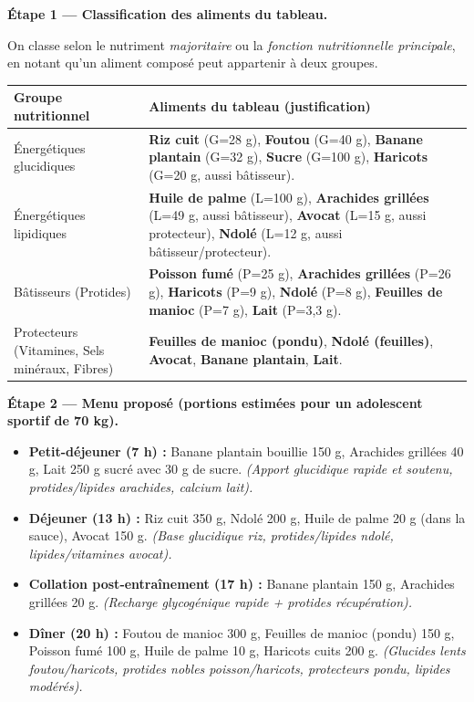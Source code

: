\documentclass[11pt]{article}
\begin{document}
\begin{exoresolu}
\textbf{Étape 1 — Classification des aliments du tableau.}

On classe selon le nutriment \emph{majoritaire} ou la \emph{fonction nutritionnelle principale}, en notant qu'un aliment composé peut appartenir à deux groupes.

\begin{center}
\begin{tabularx}{\linewidth}{|l|X|}
\hline
\rowcolor{poporangeL} \textbf{Groupe nutritionnel} & \textbf{Aliments du tableau (justification)} \\
\hline
Énergétiques glucidiques & \textbf{Riz cuit} (G=28 g), \textbf{Foutou} (G=40 g), \textbf{Banane plantain} (G=32 g), \textbf{Sucre} (G=100 g), \textbf{Haricots} (G=20 g, aussi bâtisseur). \\
\hline
Énergétiques lipidiques & \textbf{Huile de palme} (L=100 g), \textbf{Arachides grillées} (L=49 g, aussi bâtisseur), \textbf{Avocat} (L=15 g, aussi protecteur), \textbf{Ndolé} (L=12 g, aussi bâtisseur/protecteur). \\
\hline
Bâtisseurs (Protides) & \textbf{Poisson fumé} (P=25 g), \textbf{Arachides grillées} (P=26 g), \textbf{Haricots} (P=9 g), \textbf{Ndolé} (P=8 g), \textbf{Feuilles de manioc} (P=7 g), \textbf{Lait} (P=3,3 g). \\
\hline
Protecteurs (Vitamines, Sels minéraux, Fibres) & \textbf{Feuilles de manioc (pondu)}, \textbf{Ndolé (feuilles)}, \textbf{Avocat}, \textbf{Banane plantain}, \textbf{Lait}. \\
\hline
\end{tabularx}
\end{center}

\textbf{Étape 2 — Menu proposé (portions estimées pour un adolescent sportif de 70 kg).}

\begin{itemize}
\item \textbf{Petit-déjeuner (7 h) :} Banane plantain bouillie 150 g, Arachides grillées 40 g, Lait 250 g sucré avec 30 g de sucre. \textit{(Apport glucidique rapide et soutenu, protides/lipides arachides, calcium lait).}
\item \textbf{Déjeuner (13 h) :} Riz cuit 350 g, Ndolé 200 g, Huile de palme 20 g (dans la sauce), Avocat 150 g. \textit{(Base glucidique riz, protides/lipides ndolé, lipides/vitamines avocat).}
\item \textbf{Collation post-entraînement (17 h) :} Banane plantain 150 g, Arachides grillées 20 g. \textit{(Recharge glycogénique rapide + protides récupération).}
\item \textbf{Dîner (20 h) :} Foutou de manioc 300 g, Feuilles de manioc (pondu) 150 g, Poisson fumé 100 g, Huile de palme 10 g, Haricots cuits 200 g. \textit{(Glucides lents foutou/haricots, protides nobles poisson/haricots, protecteurs pondu, lipides modérés).}
\end{itemize}


\end{exoresolu}
\end{document}
